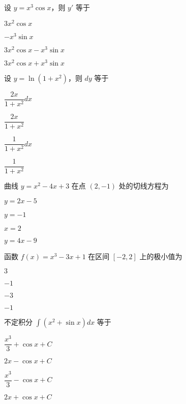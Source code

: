 \documentclass{exam-zh}
\begin{document}
\begin{question}
  设 $y = x^3 \cos x$，则 $y'$ 等于\paren[C]
  \begin{choices}
  \item $3x^2 \cos x$
  \item $-x^3 \sin x$
  \item $3x^2 \cos x - x^3 \sin x$
  \item $3x^2 \cos x + x^3 \sin x$
  \end{choices}
\end{question}

\begin{question}
  设 $y = \ln(1 + x^2)$，则 $dy$ 等于\paren[A]
  \begin{choices}
  \item $\dfrac{2x}{1 + x^2}dx$
  \item $\dfrac{2x}{1 + x^2}$
  \item $\dfrac{1}{1 + x^2}dx$
  \item $\dfrac{1}{1 + x^2}$
  \end{choices}
\end{question}

\begin{question}
  曲线 $y = x^2 - 4x + 3$ 在点 $(2, -1)$ 处的切线方程为\paren[B]
  \begin{choices}
  \item $y = 2x - 5$
  \item $y = -1$
  \item $x = 2$
  \item $y = 4x - 9$
  \end{choices}
\end{question}

\begin{question}
  函数 $f(x) = x^3 - 3x + 1$ 在区间 $[-2, 2]$ 上的极小值为\paren[D]
  \begin{choices}
  \item $3$
  \item $-1$
  \item $-3$
  \item $-1$
  \end{choices}
\end{question}

\begin{question}
  不定积分 $\int (x^2 + \sin x) dx$ 等于\paren[C]
  \begin{choices}
  \item $\dfrac{x^3}{3} + \cos x + C$
  \item $2x - \cos x + C$
  \item $\dfrac{x^3}{3} - \cos x + C$
  \item $2x + \cos x + C$
  \end{choices}
\end{question}
\end{document}
